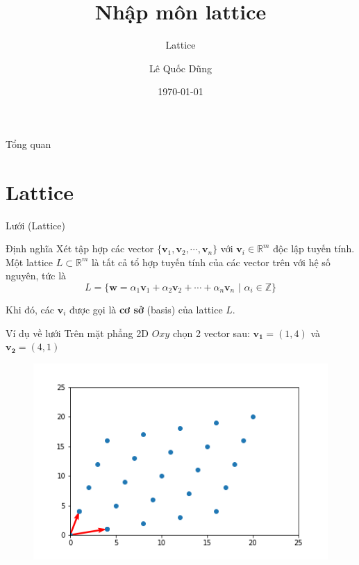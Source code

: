 \documentclass[aspectratio=169,xcolor=dvipsnames,serif]{beamer}
\title[short title]{Nhập môn lattice} %
\subtitle{Lattice}
\author{Lê Quốc Dũng}
\institute[MPEI] %
{
    Moscow Power Engineering Institute
}
\date{\today} %
\begin{document}
\begin{frame}
    \titlepage
\end{frame}

\begin{frame}{Tổng quan}
    \tableofcontents
\end{frame}




\section{Lattice}

\begin{frame}{Lưới (Lattice)}
    \begin{block}{Định nghĩa}
        Xét tập hợp các vector $\{ \bm{v}_1, \bm{v}_2, \cdots, 
        \bm{v}_n \}$ với $\bm{v}_i \in \mathbb{R}^m$ độc lập 
        tuyến tính. Một lattice $L \subset \mathbb{R}^m$ là 
        tất cả tổ hợp tuyến tính của các vector trên với hệ 
        số nguyên, tức là 
        \[L = \{\bm{w} =  \alpha_1 \bm{v}_1 + \alpha_2 \bm{v}_2 
        + \cdots + \alpha_n \bm{v}_n \text{ | } \alpha_i \in 
        \mathbb{Z} \} \]
        
        Khi đó, các $\bm{v}_i$ được gọi là \textbf{cơ sở} (basis) 
        của lattice $L$.
    \end{block}
    
\end{frame}

\begin{frame}{Ví dụ về lưới}
    Trên mặt phẳng 2D $Oxy$ chọn 2 vector sau: 
    $\bm{v_1} = (1, 4)$ và $\bm{v_2}=(4,1)$
    \begin{figure}
        \centering
        \includegraphics[scale=0.5]{lattice.png}
    \end{figure}
\end{frame}
\end{document}
